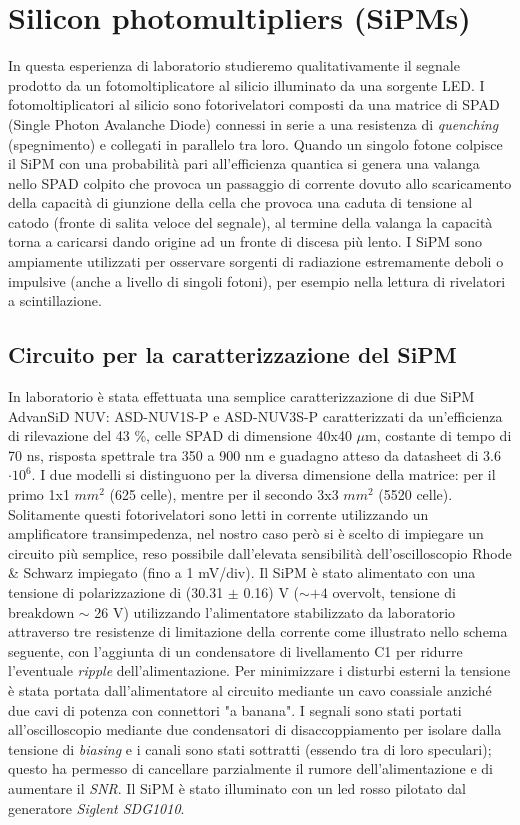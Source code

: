 \documentclass[journal]{IEEEtran}
\begin{document}
\section{Silicon photomultipliers (SiPMs)} %
In questa esperienza di laboratorio studieremo qualitativamente il segnale prodotto da un fotomoltiplicatore al silicio illuminato da una sorgente LED. I fotomoltiplicatori al silicio sono fotorivelatori composti da una matrice di SPAD (Single Photon Avalanche Diode) connessi in serie a una resistenza di \textit{quenching} (spegnimento) e collegati in parallelo tra loro. Quando un singolo fotone colpisce il SiPM con una probabilità pari all'efficienza quantica si genera una valanga nello SPAD colpito che provoca un passaggio di corrente dovuto allo scaricamento della capacità di giunzione della cella che provoca una caduta di tensione al catodo (fronte di salita veloce del segnale), al termine della valanga la capacità torna a caricarsi dando origine ad un fronte di discesa più lento. I SiPM sono ampiamente utilizzati per osservare sorgenti di radiazione estremamente deboli o impulsive (anche a livello di singoli fotoni), per esempio nella lettura di rivelatori a scintillazione.

\subsection{Circuito per la caratterizzazione del SiPM}
In laboratorio è stata effettuata una semplice caratterizzazione di due SiPM AdvanSiD NUV: ASD-NUV1S-P e ASD-NUV3S-P \cite{I} caratterizzati da un'efficienza di rilevazione del 43 \%, celle SPAD di dimensione 40x40 $\mu$m, costante di tempo di 70 ns, risposta spettrale tra 350 a 900 nm e guadagno atteso da datasheet di 3.6 $\cdot 10^6$. I due modelli si distinguono per la diversa dimensione della matrice: per il primo 1x1 $mm^2$ (625 celle), mentre per il secondo 3x3 $mm^2$ (5520 celle). Solitamente questi fotorivelatori sono letti in corrente utilizzando un amplificatore transimpedenza, nel nostro caso però si è scelto di impiegare un circuito più semplice, reso possibile dall'elevata sensibilità dell'oscilloscopio Rhode & Schwarz impiegato (fino a 1 mV/div). Il SiPM è stato alimentato con una tensione di polarizzazione di (30.31 $\pm$ 0.16) V ($\sim +4$ overvolt, tensione di breakdown $\sim$ 26 V) utilizzando l'alimentatore stabilizzato da laboratorio attraverso tre resistenze di limitazione della corrente come illustrato nello schema seguente, con l'aggiunta di un condensatore di livellamento C1 per ridurre l'eventuale \textit{ripple} dell'alimentazione. Per minimizzare i disturbi esterni la tensione è stata portata dall'alimentatore al circuito mediante un cavo coassiale anziché due cavi di potenza con connettori "a banana". I segnali sono stati portati all'oscilloscopio mediante due condensatori di disaccoppiamento per isolare dalla tensione di \textit{biasing} e i canali sono stati sottratti (essendo tra di loro speculari); questo ha permesso di cancellare parzialmente il rumore dell'alimentazione e di aumentare il \textit{SNR}. Il SiPM è stato illuminato con un led rosso pilotato dal generatore \textit{Siglent SDG1010}.
\end{document}

